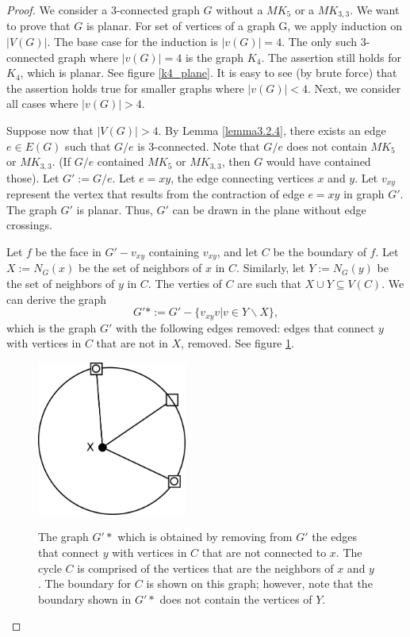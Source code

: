 \begin{proof}
We consider a 3-connected graph $G$ without a $MK_5$ or a $MK_{3,3}$. We want to prove that $G$ is planar. For set of vertices of a graph G, we apply induction on $|V(G)|$. The base case for the induction is $|v(G)|=4$. The only such 3-connected graph where $|v(G)|=4$ is the graph $K_4$. The assertion still holds for $K_4$, which is planar. See figure \ref{k4_plane}. It is easy to see (by brute force) that the assertion holds true for smaller graphs where $|v(G)|<4$.  Next, we consider all cases where $|v(G)| > 4$. 

Suppose now that $|V(G)| > 4$. By Lemma \ref{lemma3.2.4}, there exists an edge $e \in E(G)$ such that $G/e$ is 3-connected. Note that $G/e$ does not contain $MK_5$ or $MK_{3,3}$. (If $G/e$ contained $MK_5$ or $MK_{3,3}$, then $G$ would have contained those). Let $G':=G/e$. Let $e = xy$, the edge connecting vertices $x$ and $y$. Let $v_{xy}$ represent the vertex that results from the contraction of edge $e = xy$ in graph $G'$. The graph $G'$ is planar. Thus, $G'$ can be drawn in the plane without edge crossings.

Let $f$ be the face in $G' - v_{xy}$ containing $v_{xy}$, and let $C$ be the boundary of $f$. Let $X:=N_G(x)$ be the set of neighbors of $x$ in $C$. Similarly, let $Y:=N_G(y)$ be the set of neighbors of $y$ in $C$. The verties of $C$ are such that $X \cup Y \subseteq V(C)$. We can derive the graph 
$$G'*:= G' - \{v_{xy}v | v \in Y \backslash X\},$$
which is the graph $G'$ with the following edges removed: edges that connect $y$ with vertices in $C$ that are not in $X$, removed. See figure \ref{GprimeStar}.
\begin{figure}[htbp]
	\centering
	\includegraphics[height=2in]{GprimeStar} \\ 
	\caption{The graph $G'*$ which is obtained by removing from $G'$ the edges that connect $y$ with vertices in $C$ that are not connected to $x$. The cycle $C$ is comprised of the vertices that are the neighbors of $x$ and $y$. The boundary for $C$ is shown on this graph; however, note that the boundary shown in $G'*$ does not contain the vertices of $Y$.}
\label{GprimeStar}
\end{figure}


\end{proof}
